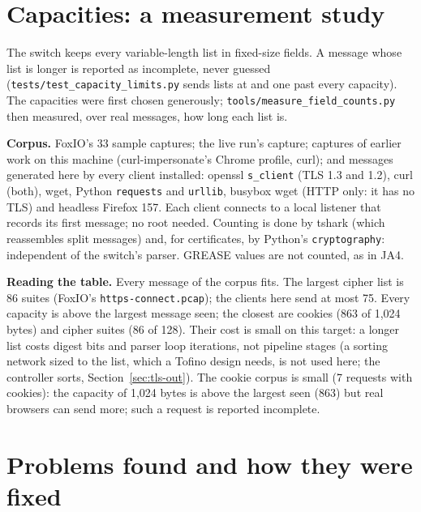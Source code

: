 \documentclass[11pt,a4paper]{article}
\newcommand{\code}[1]{\texttt{#1}}
\begin{document}
\section{Capacities: a measurement study}
\label{sec:caps}

The switch keeps every variable-length list in fixed-size fields. A message whose list is longer is reported as
incomplete, never guessed (\code{tests/test\_capacity\_limits.py} sends lists at and one past every capacity). The
capacities were first chosen generously; \code{tools/measure\_field\_counts.py} then measured, over real messages,
how long each list is.

\textbf{Corpus.} FoxIO's 33 sample captures; the live run's capture; captures of earlier work on this machine
(curl-impersonate's Chrome profile, curl); and messages generated here by every client installed: openssl
\code{s\_client} (TLS 1.3 and 1.2), curl (both), wget, Python \code{requests} and \code{urllib}, busybox wget (HTTP only:
it has no TLS) and headless Firefox 157. Each client connects to a local listener that records its first message;
no root needed. Counting is done by tshark (which reassembles split messages) and, for certificates, by Python's
\code{cryptography}: independent of the switch's parser. GREASE values are not counted, as in JA4.



\textbf{Reading the table.} Every message of the corpus fits. The largest cipher list is 86 suites (FoxIO's
\code{https-connect.pcap}); the clients here send at most 75. Every capacity is above the largest message seen; the closest are
cookies (863 of 1,024 bytes) and cipher suites (86 of 128). Their cost is small on this target: a longer list costs digest bits and parser loop
iterations, not pipeline stages (a sorting network sized to the list, which a Tofino design needs, is not used
here; the controller sorts, Section~\ref{sec:tls-out}). The cookie corpus is small (7 requests with cookies): the
capacity of 1,024 bytes is above the largest seen (863) but real browsers can send more; such a request is reported
incomplete.

\section{Problems found and how they were fixed}
\label{sec:problems}
\end{document}
